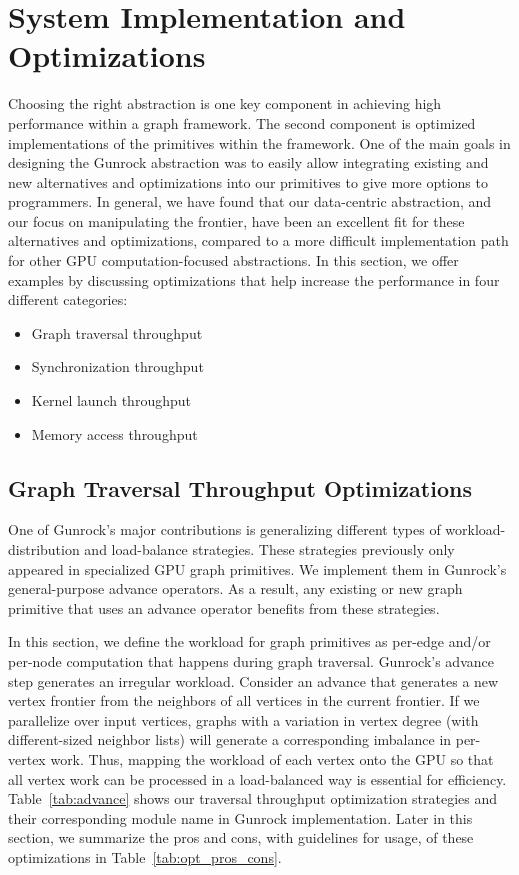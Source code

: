 \documentclass[format=acmsmall,review=false,screen=true]{acmart}
\begin{document}
\section{System Implementation and Optimizations}
\label{sec:imp_opt}
Choosing the right abstraction is one key component in achieving high
performance within a graph framework. The second component is
optimized implementations of the primitives within the framework. One
of the main goals in designing the Gunrock abstraction was to easily
allow integrating existing and new alternatives and optimizations into
our primitives to give more options to programmers. In general, we
have found that our data-centric abstraction, and our focus on
manipulating the frontier, have been an excellent fit for these
alternatives and optimizations, compared to a more difficult
implementation path for other GPU computation-focused abstractions. In
this section, we offer examples by discussing optimizations that help
increase the performance in four different categories:
\begin{itemize}
\item Graph traversal throughput %
\item Synchronization throughput %
\item Kernel launch throughput %
\item Memory access throughput %
\end{itemize}

\subsection{Graph Traversal Throughput Optimizations}
\label{sec:graph-traversal}

One of Gunrock's major contributions is generalizing different types
of workload-distribution and load-balance strategies. These strategies
previously only appeared in specialized GPU graph primitives. We
implement them in Gunrock's general-purpose advance operators. As a
result, any existing or new graph primitive that uses an advance
operator benefits from these strategies.

In this section, we define the workload for graph primitives as
per-edge and/or per-node computation that happens during graph
traversal. Gunrock's advance step generates an irregular workload.
Consider an advance that generates a new vertex frontier from the
neighbors of all vertices in the current frontier. If we parallelize
over input vertices, graphs with a variation in vertex degree (with
different-sized neighbor lists) will generate a corresponding
imbalance in per-vertex work. Thus, mapping the workload of each
vertex onto the GPU so that all vertex work can be processed in a
load-balanced way is essential for efficiency. Table~\ref{tab:advance}
shows our traversal throughput optimization strategies and their
corresponding module name in Gunrock implementation. Later in this
section, we summarize the pros and cons, with guidelines for usage, of
these optimizations in Table~\ref{tab:opt_pros_cons}.
\end{document}
